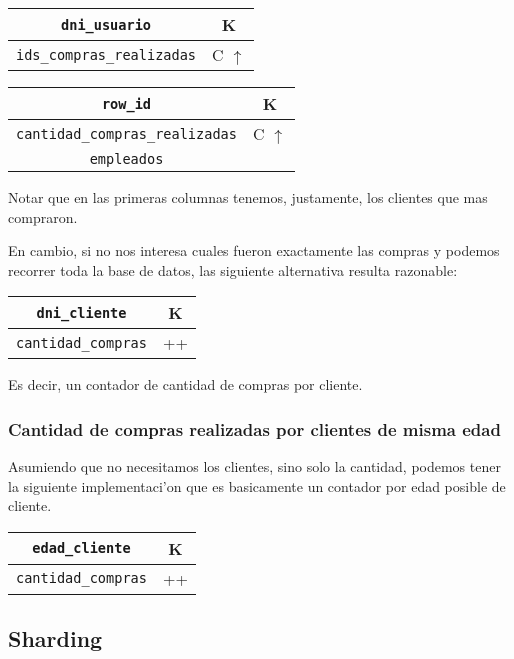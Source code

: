 \begin{center}
\begin{tabular}{|c|c|}
\hline
\texttt{dni\_usuario} & K\\
\hline
\texttt{ids\_compras\_realizadas} & C $\uparrow$\\
\hline
\end{tabular}
\end{center}

\begin{center}
\begin{tabular}{|c|c|}
\hline
\texttt{row\_id} & K\\
\hline
\texttt{cantidad\_compras\_realizadas} & C $\uparrow$\\
\hline
\texttt{empleados} & \\
\hline
\end{tabular}
\end{center}

Notar que en las primeras columnas tenemos, justamente, los clientes que 
mas compraron.


En cambio, si no nos interesa cuales fueron exactamente las compras y podemos recorrer
toda la base de datos, las siguiente alternativa resulta razonable:

\begin{center}
\begin{tabular}{|c|c|}
\hline
\texttt{dni\_cliente} & K\\
\hline
\texttt{cantidad\_compras} & ++\\
\hline
\end{tabular}
\end{center}

Es decir, un contador de cantidad de compras por cliente.

\subsubsection{Cantidad de compras realizadas por clientes de misma edad}

Asumiendo que no necesitamos los clientes, sino solo la cantidad, podemos
tener la siguiente implementaci'on que es basicamente un contador por 
edad posible de cliente.

\begin{center}
\begin{tabular}{|c|c|}
\hline
\texttt{edad\_cliente} & K\\
\hline
\texttt{cantidad\_compras} & ++\\
\hline
\end{tabular}
\end{center}

\subsection{Sharding}
